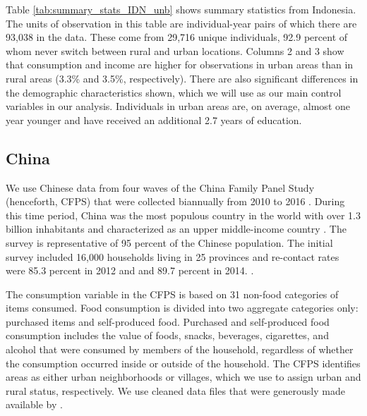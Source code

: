 \documentclass[12pt]{article}
\begin{document}
Table \ref{tab:summary_stats_IDN_unb} shows summary statistics from Indonesia. The units of observation in this table are individual-year pairs of which there are 93,038 in the data. These come from 29,716 unique individuals, 92.9 percent of whom never switch between rural and urban locations. 
Columns 2 and 3 show that consumption and income are higher for observations in urban areas than in rural areas (3.3\% and 3.5\%, respectively). There are also significant differences in the demographic characteristics shown, which we will use as our main control variables in our analysis. Individuals in urban areas are, on average, almost one year younger and have received an additional 2.7 years of education.





\subsection{China}\label{subsec:China-data}
We use Chinese data from four waves of the China Family Panel Study (henceforth, CFPS) that  were collected biannually from 2010 to 2016 \citep{ISSS2015}. During this time period, China was the most populous country in the world with over 1.3 billion inhabitants and characterized as an upper middle-income country \citep{worldbank2024wdi}.
The survey is representative of 95 percent of the Chinese population. The initial survey included 16,000 households living in 25 provinces and re-contact rates were 85.3 percent in 2012 and and 89.7 percent in 2014.
 \citep{lagakosMigrationCostsObservational2020}.

The consumption variable in the CFPS is based on 31 non-food categories of items consumed. Food consumption is divided into two aggregate categories only: purchased items and self-produced food. Purchased and self-produced food consumption includes the value of foods, snacks, beverages, cigarettes, and alcohol that were consumed by members of the household, regardless of whether the consumption occurred inside or outside of the household. 
The CFPS identifies areas as either urban neighborhoods or villages, which we use to assign urban and rural status, respectively. 
We use cleaned data files that were generously made available by \cite{lagakosMigrationCostsObservational2020}.
\end{document}
